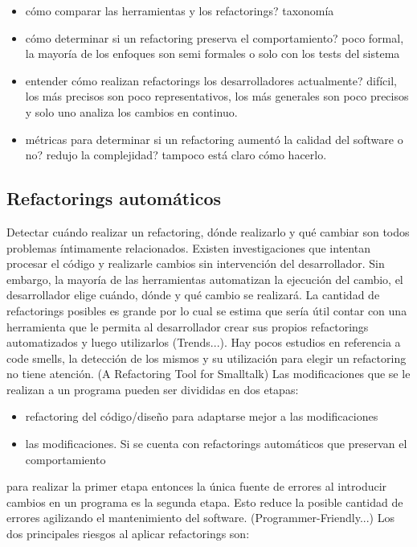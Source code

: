 \begin{itemize}
    \item cómo comparar las herramientas y los refactorings? taxonomía
    \item cómo determinar si un refactoring preserva el comportamiento? poco formal, la mayoría de
    los enfoques son semi formales o solo con los tests del sistema
    \item entender cómo realizan refactorings los desarrolladores actualmente? difícil, los más
    precisos son poco representativos, los más generales son poco precisos y solo uno analiza los
    cambios en continuo.
    \item métricas para determinar si un refactoring aumentó la calidad del software o no? redujo la
    complejidad? tampoco está claro cómo hacerlo.
\end{itemize}


\subsection{Refactorings automáticos}
Detectar cuándo realizar un refactoring, dónde realizarlo y qué cambiar son todos problemas
íntimamente relacionados. Existen investigaciones que intentan procesar el código y realizarle
cambios sin intervención del desarrollador. Sin embargo, la mayoría de las herramientas automatizan
la ejecución del cambio, el desarrollador elige cuándo, dónde y qué cambio se realizará. La cantidad
de refactorings posibles es grande por lo cual se estima que sería útil contar con una herramienta
que le permita al desarrollador crear sus propios refactorings automatizados y luego utilizarlos
(Trends...). Hay pocos estudios en referencia a code smells, la detección de los mismos y su
utilización para elegir un refactoring no tiene atención.
(A Refactoring Tool for Smalltalk)
Las modificaciones que se le realizan a un programa pueden ser divididas en dos etapas:

\begin{itemize}
    \item refactoring del código/diseño para adaptarse mejor a las modificaciones
    \item las modificaciones. Si se cuenta con refactorings automáticos que preservan el comportamiento
\end{itemize}

para realizar la primer etapa entonces la única fuente de errores al introducir cambios en un
programa es la segunda etapa. Esto reduce la posible cantidad de errores agilizando el mantenimiento
del software.
(Programmer-Friendly...) Los dos principales riesgos al aplicar refactorings son:

